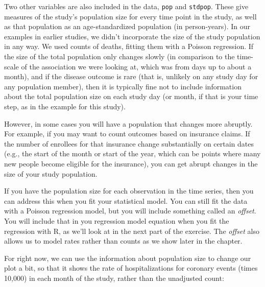 \documentclass[
]{book}
\begin{document}
Two other variables are also included in the data, \texttt{pop} and \texttt{stdpop}. These give measures of the study's population size for every time point in the study, as well as that population as an age-standardized population (in person-years). In our examples in earlier studies, we didn't incorporate the size of the study population in any way. We used counts of deaths, fitting them with a Poisson regression. If the size of the total population only changes slowly (in comparison to the time-scale of the association we were looking at, which was from days up to about a month), and if the disease outcome is rare (that is, unlikely on any study day for any population member), then it is typically fine not to include information about the total population size on each study day (or month, if that is your time step, as in the example for this study).

However, in some cases you will have a population that changes more abruptly. For example, if you may want to count outcomes based on insurance claims. If the number of enrollees for that insurance change substantially on certain dates (e.g., the start of the month or start of the year, which can be points where many new people become eligible for the insurance), you can get abrupt changes in the size of your study population.

If you have the population size for each observation in the time series, then you can address this when you fit your statistical model. You can still fit the data with a Poisson regression model, but you will include something called an \emph{offset}. You will include that in you regression model equation when you fit the regression with R, as we'll look at in the next part of the exercise. The \emph{offset} also allows us to model rates rather than counts as we show later in the chapter.

For right now, we can use the information about population size to change our plot a bit, so that it shows the rate of hospitalizations for coronary events (times 10,000) in each month of the study, rather than the unadjusted count:
\end{document}
